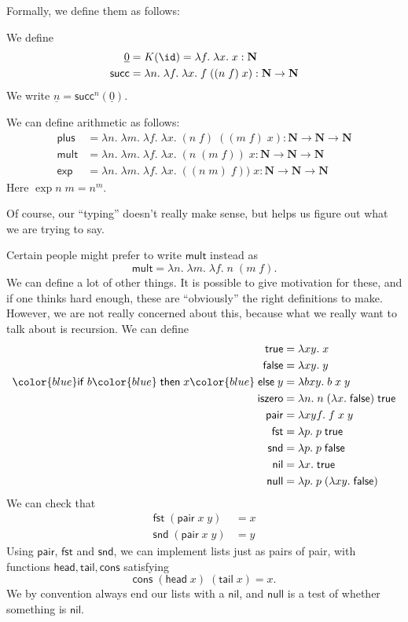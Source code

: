 \documentclass[a4paper]{article}
\newcommand\head{\mathsf{head}}
\newcommand\tail{\mathsf{tail}}
\newcommand\pair{\mathsf{pair}}
\newcommand\plus{\mathsf{plus}}
\newcommand\mult{\mathsf{mult}}
\newcommand\lexp{\mathsf{exp}}
\renewcommand\succ{\mathsf{succ}}
\newcommand\cif{{\color{blue} \mathsf{if}\;}}
\newcommand\cthen{{\color{blue}\;\mathsf{then}\;}}
\newcommand\celse{{\color{blue}\;\mathsf{else}\;}}
\newcommand\ctrue{\mathsf{true}}
\newcommand\cons{\mathsf{cons}}
\newcommand\cfalse{\mathsf{false}}
\newcommand\ciszero{\mathsf{iszero}}
\newcommand\cfst{\mathsf{fst}}
\newcommand\csnd{\mathsf{snd}}
\newcommand\cnil{\mathsf{nil}}
\newcommand\cnull{\mathsf{null}}
\begin{document}
Formally, we define them as follows:
\begin{defi}
  We define
  \begin{align*}
    \underline{0} &= K(\id) = \lambda f.\; \lambda x.\; x : \mathbf{N}\\
    \succ &= \lambda n.\; \lambda f.\; \lambda x.\; f\; ((n\; f)\; x) : \mathbf{N} \to \mathbf{N}
  \end{align*}
  We write $\underline{n} = \succ^n(\underline{0})$.

  We can define arithmetic as follows:
  \begin{align*}
    \plus &= \lambda n.\; \lambda m.\; \lambda f.\; \lambda x.\; (n\;f)\;((m\;f)\;x): \mathbf{N} \to \mathbf{N} \to \mathbf{N}\\
    \mult &= \lambda n.\; \lambda m.\; \lambda f.\; \lambda x.\; (n\;(m\; f))\;x: \mathbf{N} \to \mathbf{N} \to \mathbf{N}\\
    \lexp &= \lambda n.\; \lambda m.\; \lambda f.\; \lambda x.\; ((n\;m)\;f))\;x: \mathbf{N} \to \mathbf{N} \to \mathbf{N}
  \end{align*}
  Here $\exp n\; m = n^m$.
\end{defi}
Of course, our ``typing'' doesn't really make sense, but helps us figure out what we are trying to say.

Certain people might prefer to write $\mult$ instead as
\[
  \mult = \lambda n.\; \lambda m.\;\lambda f.\; n\; (m\;f).
\]
We can define a lot of other things. It is possible to give motivation for these, and if one thinks hard enough, these are ``obviously'' the right definitions to make. However, we are not really concerned about this, because what we really want to talk about is recursion. We can define
\begin{align*} %
  \ctrue &= \lambda xy.\; x\\
  \cfalse &= \lambda xy.\; y\\
  \cif b \cthen x \celse y &= \lambda b x y.\; b\;x\;y\\
  \ciszero &= \lambda n.\; n \;(\lambda x.\; \cfalse)\; \ctrue\\
  \pair &= \lambda x y f.\; f\; x\; y\\
  \cfst &= \lambda p.\; p\;\ctrue\\
  \csnd &= \lambda p.\; p\;\cfalse\\
  \cnil &= \lambda x.\; \ctrue\\
  \cnull &= \lambda p.\; p \;( \lambda xy.\; \cfalse)
\end{align*}
We can check that
\begin{align*}
  \cfst\; (\pair\; x\; y) &= x\\
  \csnd\; (\pair\; x\; y) &= y
\end{align*}
Using $\pair$, $\cfst$ and $\csnd$, we can implement lists just as pairs of pair, with functions $\head, \tail, \cons$ satisfying
\[
  \cons\; (\head \;x)\; (\tail \;x) = x.
\]
We by convention always end our lists with a $\cnil$, and $\cnull$ is a test of whether something is $\cnil$.
\end{document}
